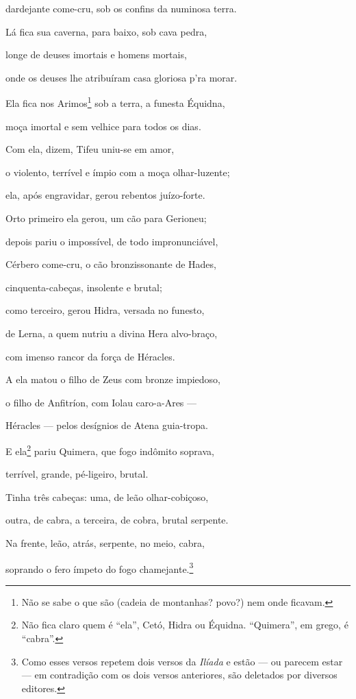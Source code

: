 \begin{pages}
\begin{Rightside}
dardejante come-cru, sob os confins da numinosa terra. 

Lá fica sua caverna, para baixo, sob cava pedra,

longe de deuses imortais e homens mortais,

onde os deuses lhe atribuíram casa gloriosa p'ra morar.

\quad{}Ela fica nos Arimos\footnote{Não se sabe o que são (cadeia de montanhas? povo?) nem onde ficavam.} sob a terra, a funesta Équidna,

moça imortal e sem velhice para todos os dias. 

Com ela, dizem, Tifeu uniu-se em amor,

o violento, terrível e ímpio com a moça olhar-luzente;

ela, após engravidar, gerou rebentos juízo-forte.

Orto primeiro ela gerou, um cão para Gerioneu;

depois pariu o impossível, de todo impronunciável, 

Cérbero come-cru, o cão bronzissonante de Hades,

cinquenta-cabeças, insolente e brutal;

como terceiro, gerou Hidra, versada no funesto,

de Lerna, a quem nutriu a divina Hera alvo-braço,

com imenso rancor da força de Héracles. 

A ela matou o filho de Zeus com bronze impiedoso,

o filho de Anfitríon, com Iolau caro-a-Ares ---

Héracles --- pelos desígnios de Atena guia-tropa.

E ela\footnote{Não fica claro quem é ``ela'', Cetó, Hidra ou Équidna. ``Quimera'',
em grego, é ``cabra''.} pariu Quimera, que fogo indômito soprava,

terrível, grande, pé-ligeiro, brutal. 

Tinha três cabeças: uma, de leão olhar-cobiçoso,

outra, de cabra, a terceira, de cobra, brutal serpente.

Na frente, leão, atrás, serpente, no meio, cabra,

soprando o fero ímpeto do fogo chamejante.\footnote{Como esses versos repetem dois versos da \emph{Ilíada} e estão
--- ou parecem estar --- em contradição com os dois versos anteriores, são
deletados por diversos editores.}


\end{Rightside}
\end{pages}
